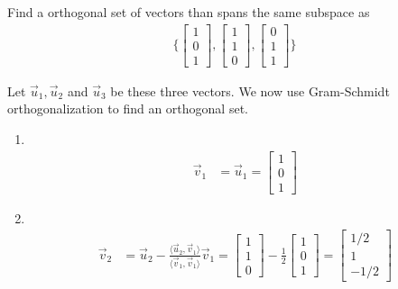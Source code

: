 \begin{example}
Find a orthogonal set of vectors than spans the same subspace as
%
\begin{align*}
\{ \begin{bmatrix}
1 \\ 0 \\ 1 
\end{bmatrix}, \begin{bmatrix}
1 \\ 1 \\ 0 
\end{bmatrix}, \begin{bmatrix}
0 \\ 1 \\ 1
\end{bmatrix} \}
\end{align*}

\solution
Let $\vec{u}_1, \vec{u}_2$ and $\vec{u}_3$ be these three vectors.  We now use Gram-Schmidt orthogonalization to find an orthogonal set.  
%
\begin{enumerate}
\item  ~
%
\begin{align*}
\vec{v}_1 & = \vec{u}_1 = \begin{bmatrix}
1 \\ 0 \\ 1 
\end{bmatrix}
\end{align*}
\item ~
\begin{align*}
\vec{v}_2& = \vec{u}_2 - \frac{\langle \vec{u}_2, \vec{v}_1 \rangle}{\langle \vec{v}_1, \vec{v}_1 \rangle} \vec{v}_1  = \begin{bmatrix}
1 \\ 1\\ 0 
\end{bmatrix} - \frac{1}{2} \begin{bmatrix}
1 \\ 0 \\ 1 
\end{bmatrix} = \begin{bmatrix}
1/2 \\ 1\\ -1/2 
\end{bmatrix}
\end{align*}


\end{enumerate}
\end{example}
